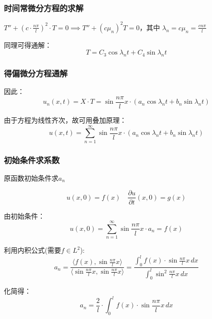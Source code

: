 \documentclass[12pt,a4paper]{article}
\numberwithin{subsection}{section}   %
\numberwithin{subsubsection}{subsection}
\theoremstyle{plain}
\theoremstyle{definition}
\theoremstyle{remark}
\theoremstyle{remark}
\begin{document}
	
	\subsubsection{时间常微分方程的求解}
	\(T'' + \left(c \cdot \frac{n\pi}{l}\right)^2 \cdot T = 0 \implies T'' + (c \mu_n)^2 T = 0\)，其中 \(\lambda_n = c \mu_n = \frac{c n \pi}{l}\)
	
	同理可得通解：
	\begin{equation}
		T = C_3 \cos \lambda_n t + C_4 \sin \lambda_n t
	\end{equation}
	
	\subsubsection{得偏微分方程通解}
	因此：
	\begin{equation}
		u_n(x, t) = X \cdot T = \sin \frac{n\pi}{l} x \cdot (a_n \cos \lambda_n t + b_n \sin \lambda_n t)
	\end{equation}
	
	由于方程为线性齐次，故可用叠加原理：
	\begin{equation}
		u(x, t) = \sum_{n=1}^{\infty} \sin \frac{n\pi}{l} x \cdot (a_n \cos \lambda_n t + b_n \sin \lambda_n t)
	\end{equation}
	
\subsubsection{初始条件求系数}
原函数初始条件求$a_n$
	
	\begin{equation}
		u(x, 0) = f(x) \quad \frac{\partial u}{\partial t}(x, 0) = g(x)
	\end{equation}
	
	由初始条件：
	\begin{equation}
		u(x, 0) = \sum_{n=1}^{\infty} \sin \frac{n\pi}{l} x \cdot a_n = f(x)
	\end{equation}
	
	利用内积公式(需要$f \in L^2$):
	\begin{equation}
		a_n = \frac{\langle f(x), \sin \frac{n\pi}{l} x \rangle}{\langle \sin \frac{n\pi}{l} x, \sin \frac{n\pi}{l} x \rangle} = \frac{\int_0^l f(x) \cdot \sin \frac{n\pi}{l} x \, dx}{\int_0^l \sin^2 \frac{n\pi}{l} x \, dx}
	\end{equation}
	
	化简得：
	\begin{equation}
		a_n = \frac{2}{l} \cdot \int_0^l f(x) \cdot \sin \frac{n\pi}{l} x \, dx
	\end{equation}
	
\end{document}
